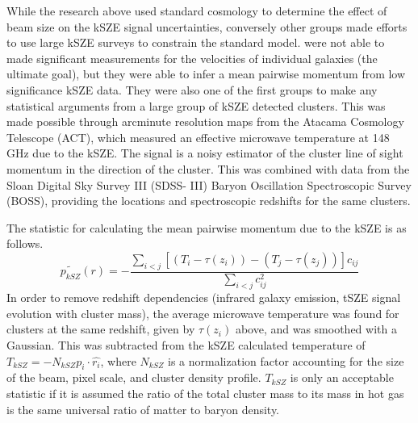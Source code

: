 \documentclass[manuscript]{aastex}
\begin{document}
While the research above used standard cosmology to determine the effect of beam size on the kSZE signal uncertainties, conversely other groups made efforts to use large kSZE surveys to constrain the standard model. \cite{Hand2012} were not able to made significant measurements for the velocities of individual galaxies (the ultimate goal), but they were able to infer a mean pairwise momentum from low significance kSZE data. They were also one of the first groups to make any statistical arguments from a large group of kSZE detected clusters. This was made possible through arcminute resolution maps from the Atacama Cosmology Telescope (ACT), which measured an effective microwave temperature at 148 GHz due to the kSZE. The signal is a noisy estimator of the cluster line of sight momentum in the direction of the cluster. This was combined with data from the Sloan Digital Sky Survey III (SDSS- III) Baryon Oscillation Spectroscopic Survey (BOSS), providing the locations and spectroscopic redshifts for the same clusters. 

The statistic for calculating the mean pairwise momentum due to the kSZE is as follows.
\begin{equation}
    \tilde{p_{kSZ}}(r) = - \frac{\sum_{i < j}[(T_{i}-\tau(z_{i})) - (T_{j}-\tau(z_{j}))]c_{ij}}{\sum_{i<j}c^{2}_{ij}}
\end{equation}
In order to remove redshift dependencies (infrared galaxy emission, tSZE signal evolution with cluster mass), the average microwave temperature was found for clusters at the same redshift, given by $\tau(z_{i})$ above, and was smoothed with a Gaussian. This was subtracted from the kSZE calculated temperature of $T_{kSZ} = - N_{kSZ} p_{i} \cdot \hat{r_{i}}$, where $N_{kSZ}$ is a normalization factor accounting for the size of the beam, pixel scale, and cluster density profile. $T_{kSZ}$ is only an acceptable statistic if it is assumed the ratio of the total cluster mass to its mass in hot gas is the same universal ratio of matter to baryon density. 
\end{document}
